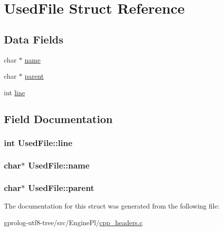 \hypertarget{structUsedFile}{}\section{Used\+File Struct Reference}
\label{structUsedFile}
\subsection*{Data Fields}
\begin{DoxyCompactItemize}
\item 
char $\ast$ \hyperlink{structUsedFile_a8d4ed04924e68784f37a3f3f268ff633}{name}
\item 
char $\ast$ \hyperlink{structUsedFile_a3bf412b1901e0513545a138bfdb9b254}{parent}
\item 
int \hyperlink{structUsedFile_a5a91641c98e7812d3af04c519499dd5c}{line}
\end{DoxyCompactItemize}


\subsection{Field Documentation}
\subsubsection[{\texorpdfstring{line}{line}}]{\setlength{\rightskip}{0pt plus 5cm}int Used\+File\+::line}\hypertarget{structUsedFile_a5a91641c98e7812d3af04c519499dd5c}{}\label{structUsedFile_a5a91641c98e7812d3af04c519499dd5c}
\subsubsection[{\texorpdfstring{name}{name}}]{\setlength{\rightskip}{0pt plus 5cm}char$\ast$ Used\+File\+::name}\hypertarget{structUsedFile_a8d4ed04924e68784f37a3f3f268ff633}{}\label{structUsedFile_a8d4ed04924e68784f37a3f3f268ff633}
\subsubsection[{\texorpdfstring{parent}{parent}}]{\setlength{\rightskip}{0pt plus 5cm}char$\ast$ Used\+File\+::parent}\hypertarget{structUsedFile_a3bf412b1901e0513545a138bfdb9b254}{}\label{structUsedFile_a3bf412b1901e0513545a138bfdb9b254}


The documentation for this struct was generated from the following file\+:\begin{DoxyCompactItemize}
\item 
gprolog-\/utf8-\/tree/src/\+Engine\+Pl/\hyperlink{cpp__headers_8c}{cpp\+\_\+headers.\+c}\end{DoxyCompactItemize}
